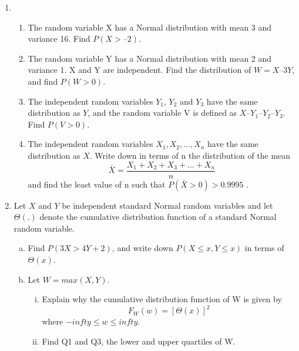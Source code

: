 \documentclass[a4paper,12pt]{article}
\begin{document}

\begin{enumerate}

\item 

\begin{enumerate}
\item The random variable X has a Normal distribution with mean 3 and variance 16.
Find $P(X > –2)$.
\item The random variable Y has a Normal distribution with mean 2 and variance 1. X and Y are independent. Find the distribution of $W = X – 3Y$, and find $P(W > 0)$.
\item The independent random variables $Y_1$, $Y_2$ and $Y_3$ have the same distribution
as $Y$, and the random variable V is defined as $X – Y_1 – Y_2 – Y_3$. Find $P(V > 0)$.
\item The independent random variables $X_1, X_2,\ldots, X_n$ have the same distribution
as $X$. 
Write down in terms of n the distribution of the mean
$$ \bar{X} = \frac{X_1 + X_2 + X_3 + \ldots + X_n}{n} $$
and find the least value of n such that $P(\bar{X} > 0) > 0.9995$ .
\end{enumerate}    
    


\item 
Let $X$ and $Y$ be independent standard Normal random variables and let $\Theta(.)$ denote the cumulative distribution function of a standard Normal random variable.
\begin{enumerate}[(a)]
    \item Find $P(3X > 4Y + 2)$, and write down $P(X \leq x, Y \leq x)$ in terms of $\Theta(x)$.
\item  Let $W = max(X, Y)$.

\begin{enumerate}[(i)]
    \item Explain why the cumulative distribution function of W is given by
$$ F_{W}(w) = \left[  \Theta(x) \right]^{2} $$ where $-infty \leq w \leq infty$.

\item  Find Q1 and Q3, the lower and upper quartiles of W.
\end{enumerate}


\end{enumerate}
\end{enumerate}
\end{document}
